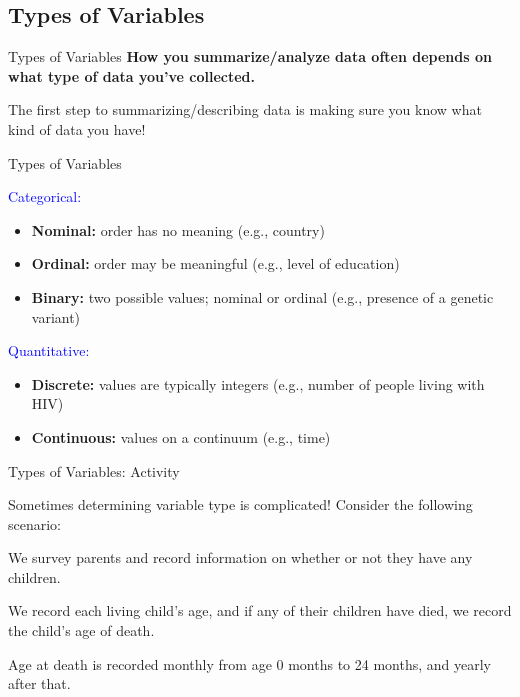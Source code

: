 \documentclass[10pt,t]{beamer}
\begin{document}
\subsection{Types of Variables}

\begin{frame}{Types of Variables}
\textbf{How you summarize/analyze data often depends on what type of data you've collected.}

\vspace{0.3cm}

The first step to summarizing/describing data is making sure you know what kind of data you have!

\end{frame}

\begin{frame}{Types of Variables}

\textcolor{blue}{Categorical:} 

\vspace{0.3cm}

\begin{itemize}
	\item \textbf{Nominal:} order has no meaning (e.g., country)
	\item \textbf{Ordinal:} order may be meaningful (e.g., level of education)
	\item \textbf{Binary:} two possible values; nominal or ordinal (e.g., presence of a genetic variant)
\end{itemize}

\vspace{0.3cm}

\textcolor{blue}{Quantitative:} 

\vspace{0.3cm}

\begin{itemize}
	\item \textbf{Discrete:} values are typically integers (e.g., number of people living with HIV)
	\item \textbf{Continuous:} values on a continuum (e.g., time)
\end{itemize}

\end{frame}

\begin{frame}{Types of Variables: Activity}

Sometimes determining variable type is complicated! Consider the following scenario:

\vspace{0.3cm}

We survey parents and record information on whether or not they have any children. 
\bigskip

We record each living child's age, and if any of their children have died, we record the child's age of death.
\bigskip

 Age at death is recorded monthly from age 0 months to 24 months, and yearly after that. 

\end{frame}
\end{document}
